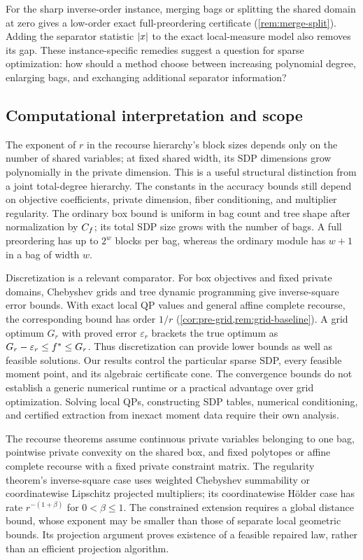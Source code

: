 For the sharp inverse-order instance, merging bags or splitting the shared
domain at zero gives a low-order exact full-preordering certificate
(\cref{rem:merge-split}). Adding the separator statistic $\lvert x\rvert$ to the
exact local-measure model also removes its gap. These instance-specific
remedies suggest a question for sparse optimization: how should a method
choose between increasing polynomial degree, enlarging bags, and exchanging
additional separator information?

\subsection{Computational interpretation and scope}

The exponent of $r$ in the recourse hierarchy's block sizes depends only
on the number of shared variables; at fixed shared width, its SDP dimensions
grow polynomially in the private dimension. This is a useful structural distinction from a
joint total-degree hierarchy. The constants in the accuracy bounds still
depend on objective coefficients, private dimension, fiber conditioning,
and multiplier regularity. The ordinary box bound is uniform in bag count
and tree shape after normalization by $C_f$; its total SDP size grows with
the number of bags. A full preordering has up to $2^w$ blocks per bag,
whereas the ordinary module has $w+1$ in a bag of width $w$.

Discretization is a relevant comparator. For box objectives and fixed
private domains, Chebyshev grids and tree dynamic programming give
inverse-square error bounds. With exact local QP values and general affine
complete recourse, the corresponding bound has order $1/r$
(\cref{cor:pre-grid,rem:grid-baseline}). A grid optimum $G_r$ with proved
error $\varepsilon_r$ brackets the true optimum as
$G_r-\varepsilon_r\le f^{*}\le G_r$. Thus discretization can provide lower
bounds as well as feasible solutions. Our results control the particular
sparse SDP, every feasible moment point, and its algebraic certificate
cone. The convergence bounds do not establish a generic numerical runtime
or a practical advantage over grid optimization. Solving local QPs,
constructing SDP tables, numerical conditioning, and certified extraction
from inexact moment data require their own analysis.

The recourse theorems assume continuous private variables belonging to one
bag, pointwise private convexity on the shared box, and fixed polytopes or
affine complete recourse with a fixed private constraint matrix. The
regularity theorem's inverse-square case uses weighted Chebyshev
summability or coordinatewise Lipschitz projected multipliers; its
coordinatewise Hölder case has rate $r^{-(1+\beta)}$ for $0<\beta\le1$.
The constrained extension requires a global distance bound, whose exponent
may be smaller than those of separate local geometric bounds. Its projection argument
proves existence of a feasible repaired law, rather than an efficient
projection algorithm.

